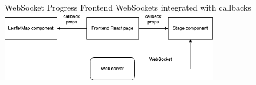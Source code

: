 



\begin{frame}{WebSocket Progress}
    Frontend WebSockets integrated with callbacks
    \includegraphics[height=0.7\textheight,width=0.7\textwidth,keepaspectratio]{mm_1-24_callbacks.png}
\end{frame}

